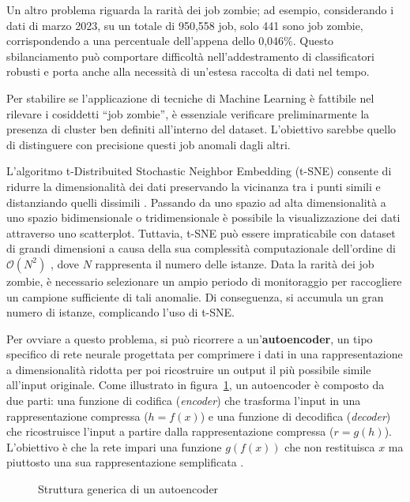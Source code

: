 Un altro problema riguarda la rarità dei job zombie; ad esempio, considerando
i dati di marzo 2023, su un totale di 950,558 job, solo 441 sono job zombie,
corrispondendo a una percentuale dell'appena dello 0,046\%. Questo
sbilanciamento può comportare difficoltà nell'addestramento di classificatori
robusti e porta anche alla necessità di un'estesa raccolta di dati nel tempo.

Per stabilire se l'applicazione di tecniche di Machine Learning è fattibile
nel rilevare i cosiddetti ``job zombie'', è essenziale verificare
preliminarmente la presenza di cluster ben definiti all'interno del dataset.
L'obiettivo sarebbe quello di distinguere con precisione questi job anomali
dagli altri. 

L'algoritmo t-Distribuited Stochastic Neighbor Embedding (t-SNE) consente di
ridurre la dimensionalità dei dati preservando la vicinanza tra i punti simili
e distanziando quelli dissimili \cite{vanderMaaten2008}. Passando da uno
spazio ad alta dimensionalità a uno spazio bidimensionale o tridimensionale è
possibile la visualizzazione dei dati attraverso uno scatterplot. Tuttavia,
t-SNE può essere impraticabile con dataset di grandi dimensioni a causa della
sua complessità computazionale dell'ordine di $\mathcal{O}(N^2)$
\cite{Pezzotti2017}, dove $N$ rappresenta il numero delle istanze. Data la
rarità dei job zombie, è necessario selezionare un ampio periodo di
monitoraggio per raccogliere un campione sufficiente di tali anomalie. Di
conseguenza, si accumula un gran numero di istanze, complicando l'uso di
t-SNE.

Per ovviare a questo problema, si può ricorrere a un'\textbf{autoencoder}, un
tipo specifico di rete neurale progettata per comprimere i dati in una
rappresentazione a dimensionalità ridotta per poi ricostruire un output il più
possibile simile all'input originale. Come illustrato in
figura~\ref{fig:structure_autoencoder}, un autoencoder è composto da due
parti: una funzione di codifica (\textit{encoder}) che trasforma l'input in
una rappresentazione compressa ($h=f(x)$) e una funzione di decodifica
(\textit{decoder}) che ricostruisce l'input a partire dalla rappresentazione
compressa ($r=g(h)$). L'obiettivo è che la rete impari una funzione $g(f(x))$
che non restituisca $x$ ma piuttosto una sua rappresentazione semplificata
\cite{Goodfellow2016}.

\begin{figure}[!ht]
    \centering
    \caption{Struttura generica di un autoencoder \cite{Goodfellow2016}} 
    \label{fig:structure_autoencoder}
\end{figure}

